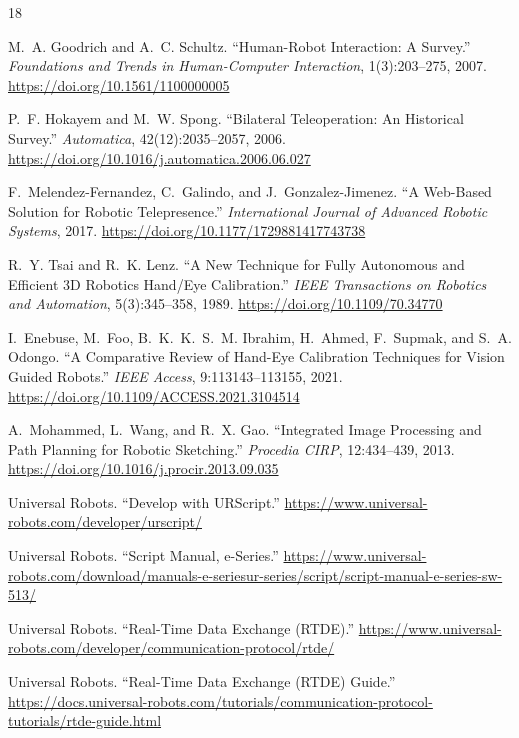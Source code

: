 \documentclass[12pt]{article}
\begin{document}
\begin{thebibliography}{18}

M.~A. Goodrich and A.~C. Schultz.
``Human-Robot Interaction: A Survey.''
\textit{Foundations and Trends in Human-Computer Interaction}, 1(3):203--275, 2007.
\url{https://doi.org/10.1561/1100000005}

P.~F. Hokayem and M.~W. Spong.
``Bilateral Teleoperation: An Historical Survey.''
\textit{Automatica}, 42(12):2035--2057, 2006.
\url{https://doi.org/10.1016/j.automatica.2006.06.027}

F.~Melendez-Fernandez, C.~Galindo, and J.~Gonzalez-Jimenez.
``A Web-Based Solution for Robotic Telepresence.''
\textit{International Journal of Advanced Robotic Systems}, 2017.
\url{https://doi.org/10.1177/1729881417743738}

R.~Y. Tsai and R.~K. Lenz.
``A New Technique for Fully Autonomous and Efficient 3D Robotics Hand/Eye Calibration.''
\textit{IEEE Transactions on Robotics and Automation}, 5(3):345--358, 1989.
\url{https://doi.org/10.1109/70.34770}

I.~Enebuse, M.~Foo, B.~K.~K.~S.~M. Ibrahim, H.~Ahmed, F.~Supmak, and S.~A. Odongo.
``A Comparative Review of Hand-Eye Calibration Techniques for Vision Guided Robots.''
\textit{IEEE Access}, 9:113143--113155, 2021.
\url{https://doi.org/10.1109/ACCESS.2021.3104514}

A.~Mohammed, L.~Wang, and R.~X. Gao.
``Integrated Image Processing and Path Planning for Robotic Sketching.''
\textit{Procedia CIRP}, 12:434--439, 2013.
\url{https://doi.org/10.1016/j.procir.2013.09.035}

Universal Robots.
``Develop with URScript.''
\url{https://www.universal-robots.com/developer/urscript/}

Universal Robots.
``Script Manual, e-Series.''
\url{https://www.universal-robots.com/download/manuals-e-seriesur-series/script/script-manual-e-series-sw-513/}

Universal Robots.
``Real-Time Data Exchange (RTDE).''
\url{https://www.universal-robots.com/developer/communication-protocol/rtde/}

Universal Robots.
``Real-Time Data Exchange (RTDE) Guide.''
\url{https://docs.universal-robots.com/tutorials/communication-protocol-tutorials/rtde-guide.html}


\end{thebibliography}
\end{document}
